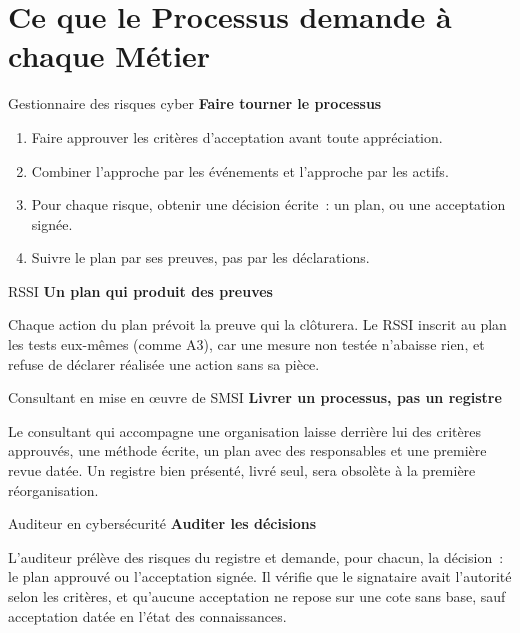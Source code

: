 \section{Ce que le Processus demande à chaque Métier}
\label{sec:c03-metiers}

\begin{boxmetier}{Gestionnaire des risques cyber}
\textbf{Faire tourner le processus}
\begin{enumerate}
    \item Faire approuver les critères d'acceptation avant toute
          appréciation.
    \item Combiner l'approche par les événements et l'approche par les
          actifs.
    \item Pour chaque risque, obtenir une décision écrite~: un plan, ou une
          acceptation signée.
    \item Suivre le plan par ses preuves, pas par les déclarations.
\end{enumerate}
\end{boxmetier}

\begin{boxmetier}{RSSI}
\textbf{Un plan qui produit des preuves}

Chaque action du plan prévoit la preuve qui la clôturera. Le RSSI inscrit
au plan les tests eux-mêmes (comme A3), car une mesure non testée
n'abaisse rien, et refuse de déclarer réalisée une action sans sa pièce.
\end{boxmetier}

\begin{boxmetier}{Consultant en mise en œuvre de SMSI}
\textbf{Livrer un processus, pas un registre}

Le consultant qui accompagne une organisation laisse derrière lui des
critères approuvés, une méthode écrite, un plan avec des responsables et
une première revue datée. Un registre bien présenté, livré seul, sera
obsolète à la première réorganisation.
\end{boxmetier}

\begin{boxmetier}{Auditeur en cybersécurité}
\textbf{Auditer les décisions}

L'auditeur prélève des risques du registre et demande, pour chacun, la
décision~: le plan approuvé ou l'acceptation signée. Il vérifie que le
signataire avait l'autorité selon les critères, et qu'aucune acceptation ne
repose sur une cote sans base, sauf acceptation datée en l'état des
connaissances.
\end{boxmetier}

